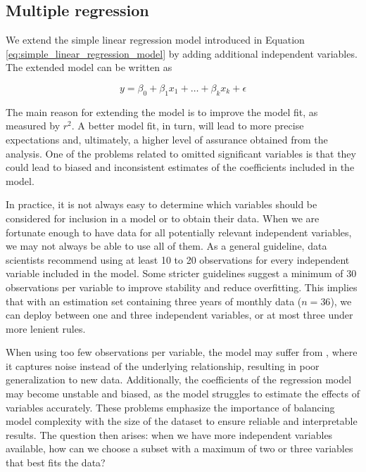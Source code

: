 

\subsection{Multiple regression} %
\label{sub:multiple_regression}

We extend the simple linear regression model introduced in Equation \ref{eq:simple_linear_regression_model} by adding additional independent variables. The extended model can be written as

\begin{equation}
 y = \beta_0 + \beta_1x_1+ \ldots + \beta_kx_k+ \epsilon
 \label{eq:multiple_linear_regression_model} 
\end{equation}

The main reason for extending the model is to improve the model fit, as measured by $r^2$. A better model fit, in turn, will lead to more precise expectations and, ultimately, a higher level of assurance obtained from the analysis. One of the problems related to omitted significant variables is that they could lead to biased and inconsistent estimates of the coefficients included in the model.

In practice, it is not always easy to determine which variables should be considered for inclusion in a model or to obtain their data. When we are fortunate enough to have data for all potentially relevant independent variables, we may not always be able to use all of them. As a general guideline, data scientists recommend using at least 10 to 20 observations for every independent variable included in the model. Some stricter guidelines suggest a minimum of 30 observations per variable to improve stability and reduce overfitting. This implies that with an estimation set containing three years of monthly data ($n = 36$), we can deploy between one and three independent variables, or at most three under more lenient rules. 

When using too few observations per variable, the model may suffer from , where it captures noise instead of the underlying relationship, resulting in poor generalization to new data. Additionally, the coefficients of the regression model may become unstable and biased, as the model struggles to estimate the effects of variables accurately. These problems emphasize the importance of balancing model complexity with the size of the dataset to ensure reliable and interpretable results. The question then arises: when we have more independent variables available, how can we choose a subset with a maximum of two or three variables that best fits the data?

